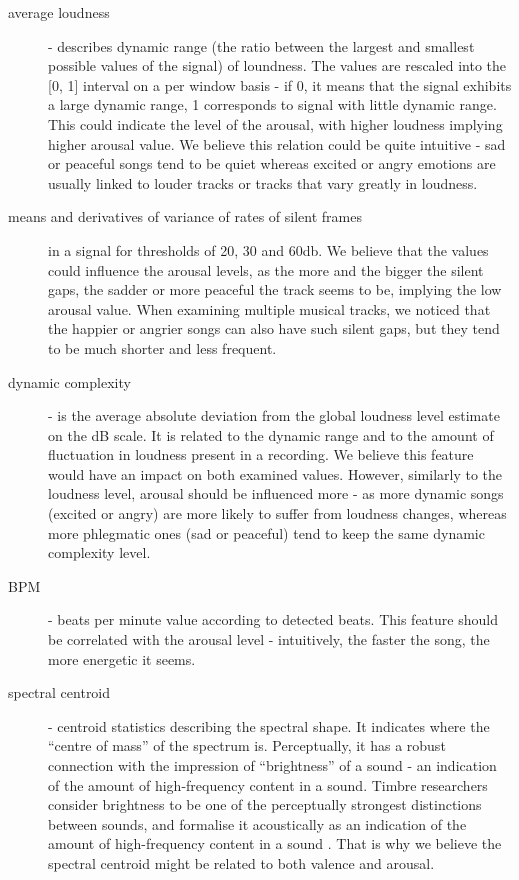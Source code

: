 \begin{description}

\item[average loudness] - describes dynamic range (the ratio between the largest and smallest possible values of the signal) of loundness. The values are rescaled into the [0, 1] interval on a per window basis - if 0, it means that the signal exhibits a large dynamic range, 1 corresponds to signal with little dynamic range. This could indicate the level of the arousal, with higher loudness implying higher arousal value. We believe this relation could be quite intuitive - sad or peaceful songs tend to be quiet whereas excited or angry emotions are usually linked to louder tracks or tracks that vary greatly in loudness.

\item[means and derivatives of variance of rates of silent frames] in a signal for thresholds of 20, 30 and 60db. We believe that the values could influence the arousal levels, as the more and the bigger the silent gaps, the sadder or more peaceful the track seems to be, implying the low arousal value. When examining multiple musical tracks, we noticed that the happier or angrier songs can also have such silent gaps, but they tend to be much shorter and less frequent.

\item[dynamic complexity] - is the average absolute deviation from the global loudness level estimate on the dB scale. It is related to the dynamic range and to the amount of fluctuation in loudness present in a recording. We believe this feature would have an impact on both examined values. However, similarly to the loudness level, arousal should be influenced more - as more dynamic songs (excited or angry) are more likely to suffer from loudness changes, whereas more phlegmatic ones (sad or peaceful) tend to keep the same dynamic complexity level.

\item[BPM] - beats per minute value according to detected beats. This feature should be correlated with the arousal level - intuitively, the faster the song, the more energetic it seems. 

\item[spectral centroid] - centroid statistics describing the spectral shape. It indicates where the ``centre of mass'' of the spectrum is. Perceptually, it has a robust connection with the impression of ``brightness'' of a sound - an indication of the amount of high-frequency content in a sound. Timbre researchers consider brightness to be one of the perceptually strongest distinctions between sounds, and formalise it acoustically as an indication of the amount of high-frequency content in a sound \cite{timber}. That is why we believe the spectral centroid might be related to both valence and arousal.


\end{description}
